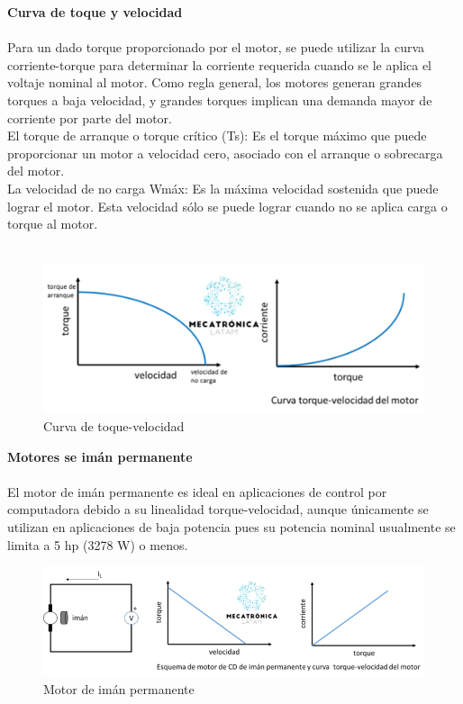 \documentclass[12pt]{report}
\begin{document}
{\huge \textbf{Curva de toque y velocidad}\\}\\
{\Large Para un dado torque proporcionado por el motor, se puede utilizar la curva corriente-torque para determinar la corriente requerida cuando se le aplica el voltaje nominal al motor.  
Como regla general, los motores generan grandes torques a baja velocidad, y grandes torques implican una demanda mayor de corriente por parte del motor.\\
El torque de arranque o torque crítico (Ts): Es el torque máximo que puede proporcionar un motor a velocidad cero, asociado con el arranque o sobrecarga del motor.\\
La velocidad de no carga Wmáx: Es la máxima velocidad sostenida que puede lograr el motor. Esta velocidad sólo se puede lograr cuando no se aplica carga o torque al motor.
}\\
\\\begin{figure}[hbtp]
\caption{Curva de toque-velocidad}
\centering
\includegraphics[scale=0.5]{../EV_2_4_giro_de_un_motor_de_corriente_directa/image4526.png}
\end{figure}
\newpage

{\huge \textbf{Motores se imán permanente }\\}\\

{\Large El motor de imán permanente es ideal en aplicaciones de control por computadora debido a su linealidad torque-velocidad, aunque únicamente se utilizan en aplicaciones de baja potencia pues su potencia nominal usualmente se limita a 5 hp (3278 W) o menos.}\\
\begin{figure}[hbtp]
\caption{Motor de imán permanente}
\centering
\includegraphics[scale=0.5]{../EV_2_4_giro_de_un_motor_de_corriente_directa/curva-motor-de-iman-permanente.png}
\end{figure}
\end{document}
